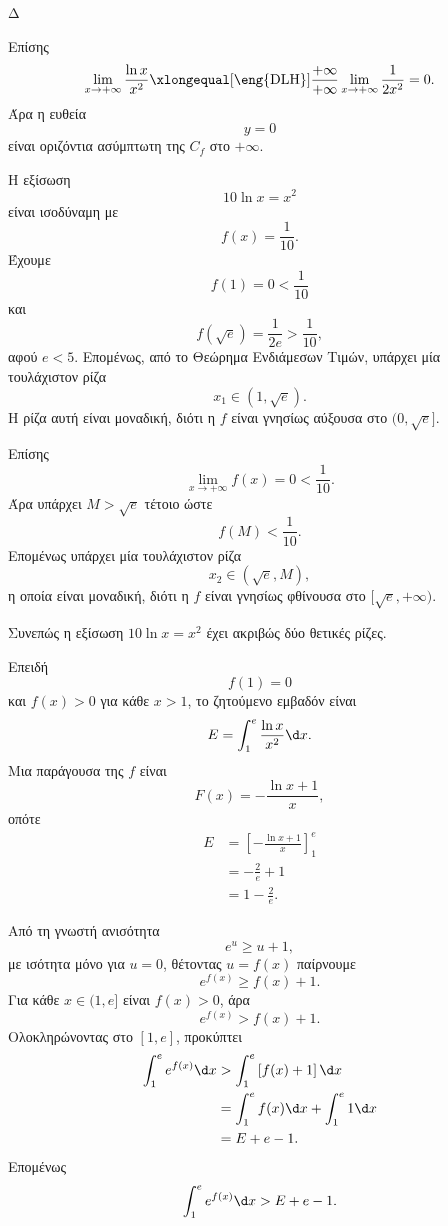 \begin{thema}{Δ}
\begin{erwthma}
Επίσης
\[
\lim_{x\to+\infty}\frac{\ln x}{x^2}
\xlongequal[\text{\eng{DLH}}]{\frac{+\infty}{+\infty}}
\lim_{x\to+\infty}\frac{1}{2x^2}
=0.
\]
Άρα η ευθεία
\[
{y=0}
\]
είναι οριζόντια ασύμπτωτη της $C_f$ στο $+\infty$.

Η εξίσωση
\[
10\ln x=x^2
\]
είναι ισοδύναμη με
\[
f(x)=\frac{1}{10}.
\]
Έχουμε
\[
f(1)=0<\frac{1}{10}
\]
και
\[
f(\sqrt{e})=\frac{1}{2e}>\frac{1}{10},
\]
αφού $e<5$. Επομένως, από το Θεώρημα Ενδιάμεσων Τιμών, υπάρχει μία τουλάχιστον ρίζα
\[
x_1\in(1,\sqrt{e}).
\]
Η ρίζα αυτή είναι μοναδική, διότι η $f$ είναι γνησίως αύξουσα στο $(0,\sqrt{e}]$.

Επίσης
\[
\lim_{x\to+\infty}f(x)=0<\frac{1}{10}.
\]
Άρα υπάρχει $M>\sqrt{e}$ τέτοιο ώστε
\[
f(M)<\frac{1}{10}.
\]
Επομένως υπάρχει μία τουλάχιστον ρίζα
\[
x_2\in(\sqrt{e},M),
\]
η οποία είναι μοναδική, διότι η $f$ είναι γνησίως φθίνουσα στο $[\sqrt{e},+\infty)$.

Συνεπώς η εξίσωση $10\ln x=x^2$ έχει ακριβώς δύο θετικές ρίζες.

\item Επειδή
\[
f(1)=0
\]
και $f(x)>0$ για κάθε $x>1$, το ζητούμενο εμβαδόν είναι
\[
E=\int_1^e\frac{\ln x}{x^2}\d x.
\]
Μια παράγουσα της $f$ είναι
\[
F(x)=-\frac{\ln x+1}{x},
\]
οπότε
\begin{align*}
E
&=\left[-\frac{\ln x+1}{x}\right]_1^e\\
&=-\frac{2}{e}+1\\
&={1-\frac{2}{e}}.
\end{align*}

Από τη γνωστή ανισότητα
\[
e^u\geq u+1,
\]
με ισότητα μόνο για $u=0$, θέτοντας $u=f(x)$ παίρνουμε
\[
e^{f(x)}\geq f(x)+1.
\]
Για κάθε $x\in(1,e]$ είναι $f(x)>0$, άρα
\[
e^{f(x)}>f(x)+1.
\]
Ολοκληρώνοντας στο $[1,e]$, προκύπτει
\begin{align*}
\int_1^e e^{f(x)}\d x
&>\int_1^e\left[f(x)+1\right]\d x\\
&=\int_1^e f(x)\d x+\int_1^e1\d x\\
&=E+e-1.
\end{align*}
Επομένως
\[
{\int_1^e e^{f(x)}\d x>E+e-1}.
\]
\end{erwthma}
\end{thema}
